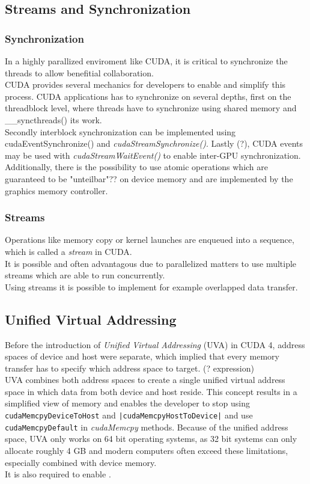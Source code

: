 \subsection{Streams and Synchronization}
\subsubsection{Synchronization}
\label{sync}
In a highly parallized enviroment like CUDA, it is critical to synchronize the threads to allow benefitial collaboration.\\
CUDA provides several mechanics for developers to enable and simplify this process. CUDA applications has to synchronize on several depths, first on the threadblock level, where threads have to synchronize using shared memory and \_\_syncthreads() its work.\\
Secondly interblock synchronization can be implemented using cudaEventSynchronize() and \emph{cudaStreamSynchronize()}. Lastly (?), CUDA events may be used with \emph{cudaStreamWaitEvent()} to enable inter-GPU synchronization.\\
Additionally, there is the possibility to use atomic operations which are guaranteed to be "unteilbar"?? on device memory and are implemented by the graphics memory controller. 
\subsubsection{Streams}
\label{streams}
Operations like memory copy or kernel launches are enqueued into a sequence, which is called a \emph{stream} in CUDA.\\
It is possible and often advantagous due to parallelized matters to use multiple streams which are able to run concurrently.\\
Using streams it is possible to implement for example overlapped data transfer.
\subsection{Unified Virtual Addressing}
\label{uva}
Before the introduction of \emph{Unified Virtual Addressing} (UVA) in CUDA 4, address spaces of device and host were separate, which implied that every memory transfer has to specify which address space to target. (? expression)\\
UVA combines both address spaces to create a single unified virtual address space in which data from both device and host reside. This concept results in a simplified view of memory and enables the developer to stop using \texttt{cudaMemcpyDeviceToHost} and \texttt{|cudaMemcpyHostToDevice|} and use \texttt{cudaMemcpyDefault} in \emph{cudaMemcpy} methods.
Because of the unified address space, UVA only works on 64 bit operating systems, as 32 bit systems can only allocate roughly 4 GB and modern computers often exceed these limitations, especially combined with device memory.\\
It is also required to enable .\\
